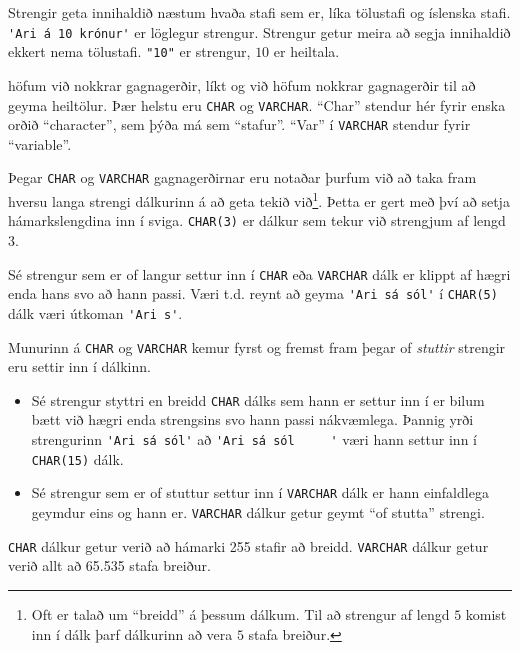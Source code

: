 Strengir geta innihaldið næstum hvaða stafi sem er, líka tölustafi og íslenska stafi. \verb|'Ari á 10 krónur'| er löglegur strengur. Strengur getur meira að segja innihaldið ekkert nema tölustafi. \verb|"10"| er strengur, $10$ er heiltala.

höfum við nokkrar gagnagerðir, líkt og við höfum nokkrar gagnagerðir til að geyma heiltölur. Þær helstu eru \verb|CHAR| og \verb|VARCHAR|. ``Char'' stendur hér fyrir enska orðið ``character'', sem þýða má sem ``stafur''. ``Var'' í \verb|VARCHAR| stendur fyrir ``variable''. 

Þegar \verb|CHAR| og \verb|VARCHAR| gagnagerðirnar eru notaðar þurfum við að taka fram hversu langa strengi dálkurinn á að geta tekið við\footnote{Oft er talað um ``breidd'' á þessum dálkum. Til að strengur af lengd $5$ komist inn í dálk þarf dálkurinn að vera $5$ stafa breiður.}. Þetta er gert með því að setja hámarkslengdina inn í sviga. \verb|CHAR(3)| er dálkur sem tekur við strengjum af lengd 3.

Sé strengur sem er of langur settur inn í \verb|CHAR| eða \verb|VARCHAR| dálk er klippt af hægri enda hans svo að hann passi. Væri t.d. reynt að geyma \verb|'Ari sá sól'| í \verb|CHAR(5)| dálk væri útkoman \verb|'Ari s'|. 

Munurinn á \verb|CHAR| og \verb|VARCHAR| kemur fyrst og fremst fram þegar of \emph{stuttir} strengir eru settir inn í dálkinn. 
\begin{itemize}
 \item Sé strengur styttri en breidd \verb|CHAR| dálks sem hann er settur inn í er bilum bætt við hægri enda strengsins svo hann passi nákvæmlega. Þannig yrði strengurinn \verb|'Ari sá sól'| að \verb|'Ari sá sól     '| væri hann settur inn í \verb|CHAR(15)| dálk.
 \item Sé strengur sem er of stuttur settur inn í \verb|VARCHAR| dálk er hann einfaldlega geymdur eins og hann er. \verb|VARCHAR| dálkur getur geymt ``of stutta'' strengi.
\end{itemize}
\verb|CHAR| dálkur getur verið að hámarki 255 stafir að breidd. \verb|VARCHAR| dálkur getur verið allt að 65.535 stafa breiður.

